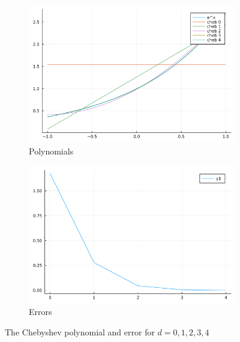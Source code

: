 \documentclass{article}
\newcommand{\1}{\bm 1}
\begin{document}
\begin{figure}[!ht]
    \centering
    \begin{subfigure}[b]{0.48\textwidth}
        \centering
        \includegraphics[width=\textwidth]{polynomial.png}
        \caption{Polynomials}
    \end{subfigure}
    \hfill
    \begin{subfigure}[b]{0.48\textwidth}
        \centering
        \includegraphics[width=\textwidth]{error.png}
        \caption{Errors}
    \end{subfigure}
       \caption{The Chebyshev polynomial and error for $d=0,1,2,3,4$}
\end{figure}

\subsection{}
\end{document}
